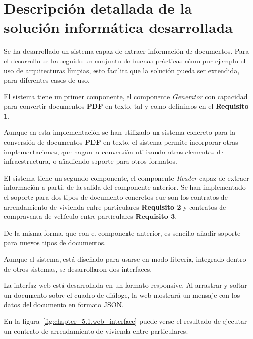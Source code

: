 \section{Descripción detallada de la solución informática desarrollada}

Se ha desarrollado un sistema capaz de extraer información de documentos.
Para el desarrollo se ha seguido un conjunto de buenas prácticas cómo por ejemplo el uso de arquitecturas límpias,
esto facilita que la solución pueda ser extendida, para diferentes casos de uso.

El sistema tiene un primer componente, el componente \textit{Generator} con capacidad para convertir documentos
\textbf{PDF} en texto, tal y como definimos en el \textbf{Requisito 1}.

Aunque en esta implementación se han utilizado un sistema concreto para la conversión de documentos \textbf{PDF}
en texto, el sistema permite incorporar otras implementaciones, que hagan la conversión utilizando otros elementos de
infraestructura, o añadiendo soporte para otros formatos.

El sistema tiene un segundo componente, el componente \textit{Reader} capaz de extraer información a partir de la
salida del componente anterior.
Se han implementado el soporte para dos tipos de documento concretos que son los contratos de arrendamiento de vivienda
entre particulares \textbf{Requisito 2} y contratos de compraventa de vehículo entre particulares \textbf{Requisito 3}.

De la misma forma, que con el componente anterior, es sencillo añadir soporte para nuevos tipos de documentos.

Aunque el sistema, está diseñado para usarse en modo librería, integrado dentro de otros sistemas, se desarrollaron
dos interfaces.

La interfaz web está desarrollada en un formato responsive.
Al arrastrar y soltar un documento sobre el cuadro de diálogo, la web mostrará un mensaje con los datos del
documento en formato JSON.

En la figura~\ref{fig:chapter_5.1.web_interface} puede verse el resultado de ejecutar un contrato de arrendamiento
de vivienda entre particulares.

